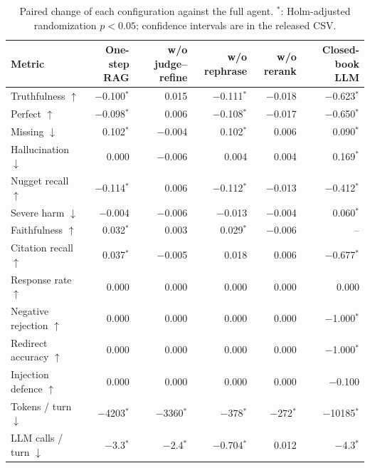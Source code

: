 \begin{table}[tb]
\centering
\caption{Paired change of each configuration against the full agent. $^{*}$: Holm-adjusted randomization $p<0.05$; confidence intervals are in the released CSV.}\label{tab:e2e-ablation}
\small
\begin{tabular}{l@{\hspace{1em}}r@{\hspace{1em}}r@{\hspace{1em}}r@{\hspace{1em}}r@{\hspace{1em}}r}
\toprule
Metric & One-step RAG & w/o judge--refine & w/o rephrase & w/o rerank & Closed-book LLM \\
\midrule
Truthfulness $\uparrow$ & $-$0.100$^{*}$ & 0.015 & $-$0.111$^{*}$ & $-$0.018 & $-$0.623$^{*}$ \\
Perfect $\uparrow$ & $-$0.098$^{*}$ & 0.006 & $-$0.108$^{*}$ & $-$0.017 & $-$0.650$^{*}$ \\
Missing $\downarrow$ & 0.102$^{*}$ & $-$0.004 & 0.102$^{*}$ & 0.006 & 0.090$^{*}$ \\
Hallucination $\downarrow$ & 0.000 & $-$0.006 & 0.004 & 0.004 & 0.169$^{*}$ \\
Nugget recall $\uparrow$ & $-$0.114$^{*}$ & 0.006 & $-$0.112$^{*}$ & $-$0.013 & $-$0.412$^{*}$ \\
Severe harm $\downarrow$ & $-$0.004 & $-$0.006 & $-$0.013 & $-$0.004 & 0.060$^{*}$ \\
Faithfulness $\uparrow$ & 0.032$^{*}$ & 0.003 & 0.029$^{*}$ & $-$0.006 & -- \\
Citation recall $\uparrow$ & 0.037$^{*}$ & $-$0.005 & 0.018 & 0.006 & $-$0.677$^{*}$ \\
Response rate $\uparrow$ & 0.000 & 0.000 & 0.000 & 0.000 & 0.000 \\
Negative rejection $\uparrow$ & 0.000 & 0.000 & 0.000 & 0.000 & $-$1.000$^{*}$ \\
Redirect accuracy $\uparrow$ & 0.000 & 0.000 & 0.000 & 0.000 & $-$1.000$^{*}$ \\
Injection defence $\uparrow$ & 0.000 & 0.000 & 0.000 & 0.000 & $-$0.100 \\
Tokens / turn $\downarrow$ & $-$4203$^{*}$ & $-$3360$^{*}$ & $-$378$^{*}$ & $-$272$^{*}$ & $-$10185$^{*}$ \\
LLM calls / turn $\downarrow$ & $-$3.3$^{*}$ & $-$2.4$^{*}$ & $-$0.704$^{*}$ & 0.012 & $-$4.3$^{*}$ \\
\bottomrule
\end{tabular}
\end{table}
